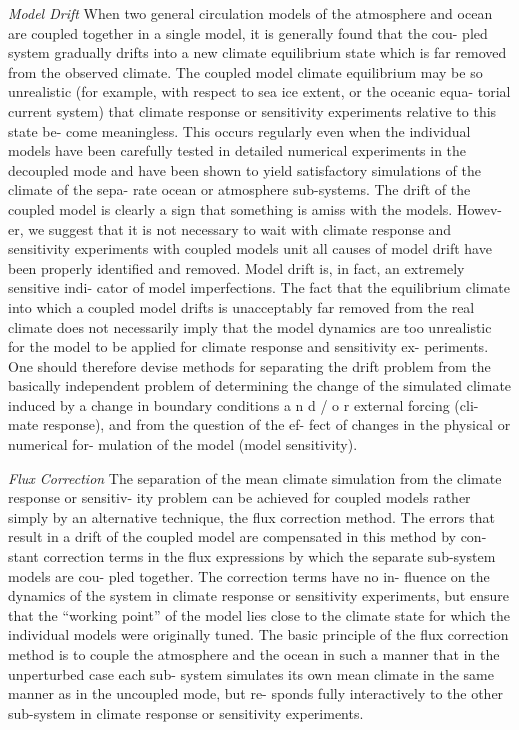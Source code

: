 \documentclass[
]{book}
\begin{document}
\emph{Model Drift}
When two general circulation models of the
atmosphere and ocean are coupled together in a
single model, it is generally found that the cou-
pled system gradually drifts into a new climate
equilibrium state which is far removed from the
observed climate. The coupled model climate
equilibrium may be so unrealistic (for example,
with respect to sea ice extent, or the oceanic equa-
torial current system) that climate response or
sensitivity experiments relative to this state be-
come meaningless. This occurs regularly even
when the individual models have been carefully
tested in detailed numerical experiments in the
decoupled mode and have been shown to yield
satisfactory simulations of the climate of the sepa-
rate ocean or atmosphere sub-systems.
The drift of the coupled model is clearly a sign
that something is amiss with the models. Howev-
er, we suggest that it is not necessary to wait with
climate response and sensitivity experiments with
coupled models unit all causes of model drift
have been properly identified and removed.
Model drift is, in fact, an extremely sensitive indi-
cator of model imperfections. The fact that the
equilibrium climate into which a coupled model
drifts is unacceptably far removed from the real
climate does not necessarily imply that the model
dynamics are too unrealistic for the model to be
applied for climate response and sensitivity ex-
periments. One should therefore devise methods
for separating the drift problem from the basically
independent problem of determining the change
of the simulated climate induced by a change in
boundary conditions a n d / o r external forcing (cli-
mate response), and from the question of the ef-
fect of changes in the physical or numerical for-
mulation of the model (model sensitivity).

\emph{Flux Correction}
The separation of the mean climate
simulation from the climate response or sensitiv-
ity problem can be achieved for coupled models
rather simply by an alternative technique, the flux
correction method.
The errors that result in a drift of the coupled
model are compensated in this method by con-
stant correction terms in the flux expressions by
which the separate sub-system models are cou-
pled together. The correction terms have no in-
fluence on the dynamics of the system in climate
response or sensitivity experiments, but ensure
that the ``working point'' of the model lies close to
the climate state for which the individual models
were originally tuned.
The basic principle of the flux correction method
is to couple the atmosphere and the ocean in such
a manner that in the unperturbed case each sub-
system simulates its own mean climate in the
same manner as in the uncoupled mode, but re-
sponds fully interactively to the other sub-system
in climate response or sensitivity experiments.
\end{document}
